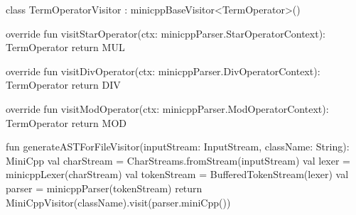 \begin{KotlinCode}[float,numbers=none,caption=Implementation of the \texttt{TermOperatorVisitor} class., label=lst:VisitorTermOpVis]
class TermOperatorVisitor : minicppBaseVisitor<TermOperator>() {
    override fun visitStarOperator(ctx: minicppParser.StarOperatorContext): TermOperator {
        return MUL
    }

    override fun visitDivOperator(ctx: minicppParser.DivOperatorContext): TermOperator {
        return DIV
    }

    override fun visitModOperator(ctx: minicppParser.ModOperatorContext): TermOperator {
        return MOD
    }
}
\end{KotlinCode}

\begin{KotlinCode}[float,numbers=none,caption=Code for the generation of the AST using the visitor-pattern., label=lst:VisitorExec]
fun generateASTForFileVisitor(inputStream: InputStream, className: String): MiniCpp 
{
    val charStream = CharStreams.fromStream(inputStream)
    val lexer = minicppLexer(charStream)
    val tokenStream = BufferedTokenStream(lexer)
    val parser = minicppParser(tokenStream)
    return MiniCppVisitor(className).visit(parser.miniCpp())
}
\end{KotlinCode}





